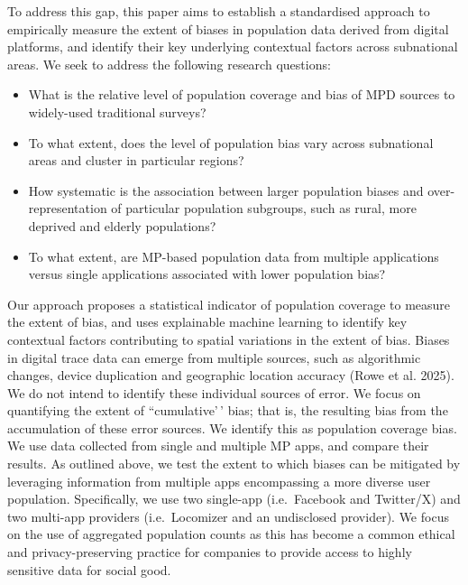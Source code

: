 \documentclass{article}
\providecommand{\tightlist}{%
  \setlength{\itemsep}{0pt}\setlength{\parskip}{0pt}}
\begin{document}
To address this gap, this paper aims to establish a standardised
approach to empirically measure the extent of biases in population data
derived from digital platforms, and identify their key underlying
contextual factors across subnational areas. We seek to address the
following research questions:

\begin{itemize}
\tightlist
\item
  What is the relative level of population coverage and bias of MPD
  sources to widely-used traditional surveys?
\item
  To what extent, does the level of population bias vary across
  subnational areas and cluster in particular regions?
\item
  How systematic is the association between larger population biases
  and over-representation of particular population subgroups, such as
  rural, more deprived and elderly populations?
\item
  To what extent, are MP-based population data from multiple
  applications versus single applications associated with lower
  population bias?
\end{itemize}

Our approach proposes a statistical indicator of population coverage to
measure the extent of bias, and uses explainable machine learning to
identify key contextual factors contributing to spatial variations in
the extent of bias. Biases in digital trace data can emerge from
multiple sources, such as algorithmic changes, device duplication and
geographic location accuracy (Rowe et al. 2025). We do not intend to
identify these individual sources of error. We focus on quantifying the
extent of ``cumulative'\,' bias; that is, the resulting bias from the
accumulation of these error sources. We identify this as population
coverage bias. We use data collected from single and multiple MP apps,
and compare their results. As outlined above, we test the extent to
which biases can be mitigated by leveraging information from multiple
apps encompassing a more diverse user population. Specifically, we use
two single-app (i.e.~Facebook and Twitter/X) and two multi-app providers
(i.e.~Locomizer and an undisclosed provider). We focus on the use of
aggregated population counts as this has become a common ethical and
privacy-preserving practice for companies to provide access to highly
sensitive data for social good.
\end{document}
